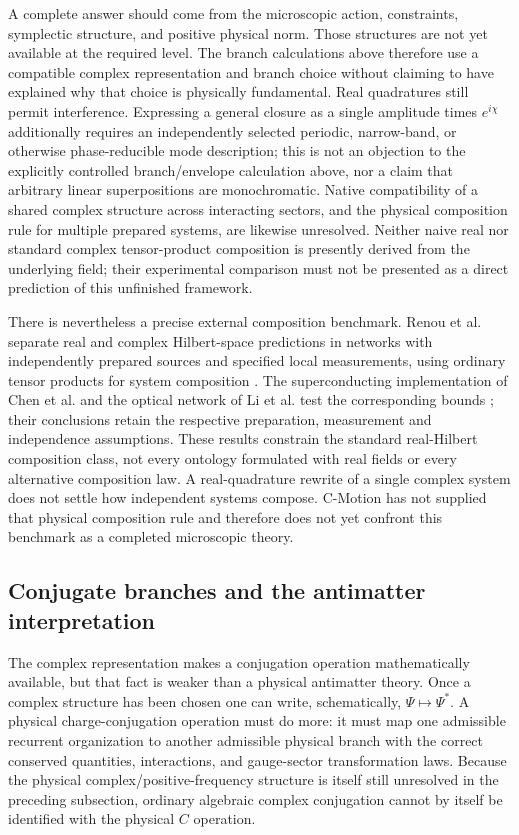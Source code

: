 \documentclass[11pt]{article}
\theoremstyle{definition}
\begin{document}
A complete answer should come from the microscopic action, constraints, symplectic structure,
and positive physical norm.  Those structures are not yet available at the required level.
The branch calculations above therefore use a compatible complex representation and branch
choice without claiming to have explained why that choice is physically fundamental.
Real quadratures still permit interference.  Expressing a general closure as a
single amplitude times $e^{i\chi}$ additionally requires an independently
selected periodic, narrow-band, or otherwise phase-reducible mode description;
this is not an objection to the explicitly controlled branch/envelope calculation
above, nor a claim that arbitrary linear superpositions are monochromatic.
Native compatibility of a shared complex structure across interacting sectors,
and the physical composition rule for multiple prepared systems, are likewise
unresolved.  Neither naive real nor standard complex tensor-product composition
is presently derived from the underlying field; their experimental comparison
must not be presented as a direct prediction of this unfinished framework.

There is nevertheless a precise external composition benchmark.
Renou et al. separate real and complex Hilbert-space predictions in networks
with independently prepared sources and specified local measurements,
using ordinary tensor products for system composition
\cite{Renou2021RealQuantum}. The superconducting implementation of Chen
et al. and the optical network of Li et al. test the corresponding bounds
\cite{Chen2022RealQT,Li2022RealQT}; their conclusions retain the respective
preparation, measurement and independence assumptions. These results constrain
the standard real-Hilbert composition class, not every ontology formulated
with real fields or every alternative composition law. A real-quadrature
rewrite of a single complex system does not settle how independent systems
compose. C-Motion has not supplied that physical composition rule and therefore
does not yet confront this benchmark as a completed microscopic theory.

\subsection{Conjugate branches and the antimatter interpretation}
\label{sec:conjugate-antimatter}

The complex representation makes a conjugation operation mathematically available, but that
fact is weaker than a physical antimatter theory.  Once a complex structure has been chosen one
can write, schematically, $\Psi\mapsto\Psi^*$.  A physical charge-conjugation operation must do
more: it must map one admissible recurrent organization to another admissible physical branch
with the correct conserved quantities, interactions, and gauge-sector transformation laws.
Because the physical complex/positive-frequency structure is itself still unresolved in the
preceding subsection, ordinary algebraic complex conjugation cannot by itself be identified with
the physical $C$ operation.
\end{document}
